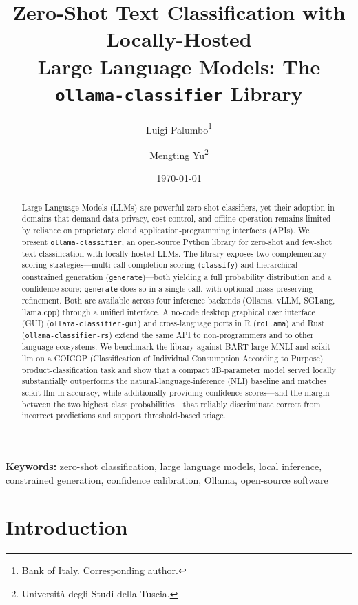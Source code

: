\documentclass[11pt,a4paper]{article}
\title{
  \textbf{Zero-Shot Text Classification with Locally-Hosted\\
  Large Language Models: The \texttt{ollama-classifier} Library}
}
\author{
  Luigi Palumbo\thanks{Bank of Italy. Corresponding author.}
  \and Mengting Yu\thanks{Università degli Studi della Tuscia.}
}
\date{\today}
\begin{document}
\maketitle

\begin{abstract}
  Large Language Models (LLMs) are powerful zero-shot classifiers, yet their
  adoption in domains that demand data privacy, cost control, and offline
  operation remains limited by reliance on proprietary cloud
  application-programming interfaces (APIs). We present
  \texttt{ollama-classifier}, an open-source Python library for zero-shot and
  few-shot text classification with locally-hosted LLMs. The library exposes
  two complementary scoring strategies---multi-call completion scoring
  (\texttt{classify}) and hierarchical constrained generation
  (\texttt{generate})---both yielding a full probability distribution and a
  confidence score; \texttt{generate} does so in a single call, with optional
  mass-preserving refinement. Both are available across four inference
  backends (Ollama, vLLM, SGLang, llama.cpp) through a unified interface. A
  no-code desktop graphical user interface (GUI)
  (\texttt{ollama-classifier-gui}) and cross-language
  ports in R (\texttt{rollama}) and Rust
  (\texttt{ollama-classifier-rs}) extend the same API to non-programmers and
  to other language ecosystems. We benchmark the library against
  BART-large-MNLI and scikit-llm on a COICOP (Classification of Individual
  Consumption According to Purpose) product-classification task and
  show that a compact 3B-parameter model served locally substantially
  outperforms the natural-language-inference (NLI) baseline and matches scikit-llm in accuracy, while
  additionally providing confidence scores---and the margin between the two
  highest class probabilities---that reliably discriminate correct from
  incorrect predictions and support threshold-based triage.
\end{abstract}

\noindent\textbf{Keywords:} zero-shot classification, large language models,
local inference, constrained generation, confidence calibration, Ollama,
open-source software

\section{Introduction}
\label{sec:introduction}
\end{document}
